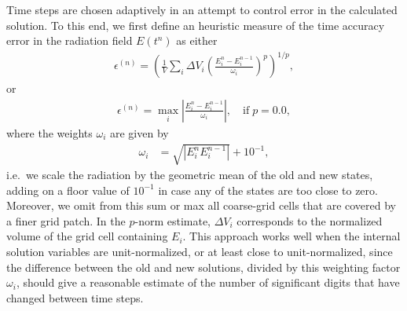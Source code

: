\documentclass[letterpaper,10pt]{article}
\renewcommand{\(}{\left(}
\renewcommand{\)}{\right)}
\begin{document}
Time steps are chosen adaptively in an attempt to control error in the
calculated solution.  To this end, we first define an heuristic
measure of the time accuracy error in the radiation field $E(t^n)$ as
either
\begin{align}
\label{eq:time_error}
  \epsilon^{(n)} = \left(\frac{1}{V} \sum_{i} \Delta V_i 
    \left(\frac{E_i^{n}-E_i^{n-1}}{\omega_i}\right)^p\right)^{1/p}, 
\end{align}
or
\begin{align}
\label{eq:time_error_inf}
  \epsilon^{(n)} = \max_i\left|\frac{E_i^{n}-E_i^{n-1}}{\omega_i}\right|,
  \quad\text{if}\; p=0.0,
\end{align}
where the weights $\omega_i$ are given by
\begin{align}
\label{eq:time_weighting}
  \omega_i &= \sqrt{\left|E_i^n E_i^{n-1}\right|} + 10^{-1},
\end{align}
i.e.~we scale the radiation by the geometric mean of the old and new
states, adding on a floor value of $10^{-1}$ in case any of the states
are too close to zero.  Moreover, we omit from this sum or max all
coarse-grid cells that are covered by a finer grid patch.  In the
$p$-norm estimate, $\Delta V_i$ corresponds to the normalized volume
of the grid cell containing $E_i$. This approach works well when the
internal solution variables are unit-normalized, or at least close to
unit-normalized, since the difference between the old and new
solutions, divided by this weighting factor $\omega_i$, should give a
reasonable estimate of the number of significant digits that have
changed between time steps. 
\end{document}

